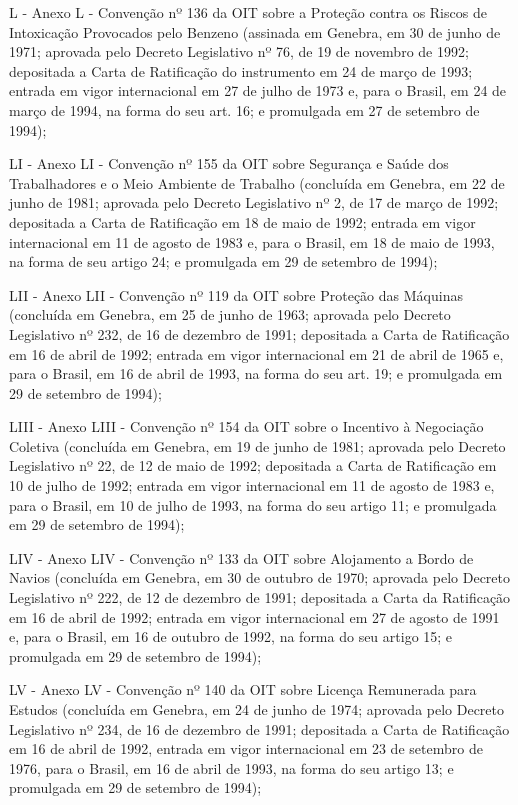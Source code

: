 \documentclass[
]{book}
\begin{document}
L - Anexo L - Convenção nº 136 da OIT sobre a Proteção contra os Riscos de Intoxicação Provocados pelo Benzeno (assinada em Genebra, em 30 de junho de 1971; aprovada pelo Decreto Legislativo nº 76, de 19 de novembro de 1992; depositada a Carta de Ratificação do instrumento em 24 de março de 1993; entrada em vigor internacional em 27 de julho de 1973 e, para o Brasil, em 24 de março de 1994, na forma do seu art. 16; e promulgada em 27 de setembro de 1994);

LI - Anexo LI - Convenção nº 155 da OIT sobre Segurança e Saúde dos Trabalhadores e o Meio Ambiente de Trabalho (concluída em Genebra, em 22 de junho de 1981; aprovada pelo Decreto Legislativo nº 2, de 17 de março de 1992; depositada a Carta de Ratificação em 18 de maio de 1992; entrada em vigor internacional em 11 de agosto de 1983 e, para o Brasil, em 18 de maio de 1993, na forma de seu artigo 24; e promulgada em 29 de setembro de 1994);

LII - Anexo LII - Convenção nº 119 da OIT sobre Proteção das Máquinas (concluída em Genebra, em 25 de junho de 1963; aprovada pelo Decreto Legislativo nº 232, de 16 de dezembro de 1991; depositada a Carta de Ratificação em 16 de abril de 1992; entrada em vigor internacional em 21 de abril de 1965 e, para o Brasil, em 16 de abril de 1993, na forma do seu art. 19; e promulgada em 29 de setembro de 1994);

LIII - Anexo LIII - Convenção nº 154 da OIT sobre o Incentivo à Negociação Coletiva (concluída em Genebra, em 19 de junho de 1981; aprovada pelo Decreto Legislativo nº 22, de 12 de maio de 1992; depositada a Carta de Ratificação em 10 de julho de 1992; entrada em vigor internacional em 11 de agosto de 1983 e, para o Brasil, em 10 de julho de 1993, na forma do seu artigo 11; e promulgada em 29 de setembro de 1994);

LIV - Anexo LIV - Convenção nº 133 da OIT sobre Alojamento a Bordo de Navios (concluída em Genebra, em 30 de outubro de 1970; aprovada pelo Decreto Legislativo nº 222, de 12 de dezembro de 1991; depositada a Carta da Ratificação em 16 de abril de 1992; entrada em vigor internacional em 27 de agosto de 1991 e, para o Brasil, em 16 de outubro de 1992, na forma do seu artigo 15; e promulgada em 29 de setembro de 1994);

LV - Anexo LV - Convenção nº 140 da OIT sobre Licença Remunerada para Estudos (concluída em Genebra, em 24 de junho de 1974; aprovada pelo Decreto Legislativo nº 234, de 16 de dezembro de 1991; depositada a Carta de Ratificação em 16 de abril de 1992, entrada em vigor internacional em 23 de setembro de 1976, para o Brasil, em 16 de abril de 1993, na forma do seu artigo 13; e promulgada em 29 de setembro de 1994);
\end{document}
